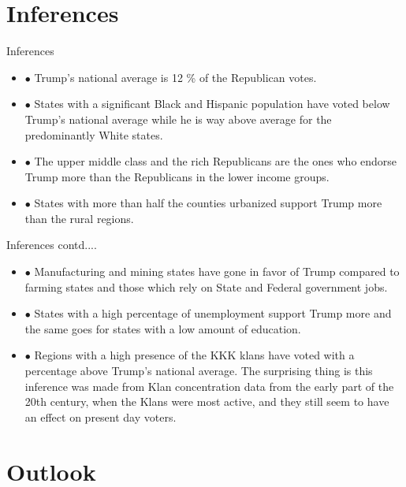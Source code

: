 \documentclass{beamer}
\begin{document}
\section[Inferences]{Inferences}
\begin{frame}{Inferences}

\begin{itemize}
\item {} {$\bullet$ Trump's national average is 12 \% of the Republican votes.}
\item {} {$\bullet$ States with a significant Black and Hispanic population have voted below Trump's national average while he is way above average for the predominantly White states.}
\item {} {$\bullet$ The upper middle class and the rich Republicans are the ones who endorse Trump more than the Republicans in the lower income groups.}
\item {} {$\bullet$ States with more than half the counties urbanized support Trump more than the rural regions.}
\end{itemize}

\end{frame}

\begin{frame}{Inferences contd....}

\begin{itemize}
\item {} {$\bullet$ Manufacturing and mining states have gone in favor of Trump compared to farming states and those which rely on State and Federal government jobs.} 
\item {} {$\bullet$ States with a high percentage of unemployment support Trump more and the same goes for states with a low amount of education.}
\item {} {$\bullet$ Regions with a high presence of the KKK klans have voted with a percentage above Trump's national average. The surprising thing is this inference was made from Klan concentration data from the early part of the 20th century, when the Klans were most active, and they still seem to have an effect on present day voters.}
\end{itemize}

\end{frame}


\section[Outlook]{Outlook}
\end{document}

